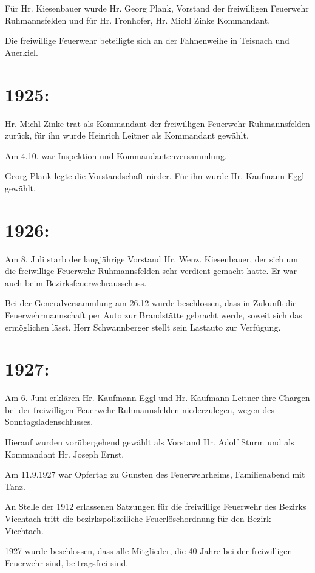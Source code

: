\documentclass[12pt,a4paper]{book}
\begin{document}
Für Hr. Kiesenbauer wurde Hr. Georg Plank, Vorstand der freiwilligen Feuerwehr
Ruhmannsfelden und für Hr. Fronhofer, Hr. Michl Zinke Kommandant.

Die freiwillige Feuerwehr beteiligte sich an der Fahnenweihe in Teisnach und
Auerkiel.

\section{1925:}

Hr. Michl Zinke trat als Kommandant der freiwilligen Feuerwehr Ruhmannsfelden
zurück, für ihn wurde Heinrich Leitner als Kommandant gewählt.

Am 4.10. war Inspektion und Kommandantenversammlung.

Georg Plank legte die Vorstandschaft nieder. Für ihn wurde Hr. Kaufmann Eggl
gewählt.

\section{1926:}

Am 8. Juli starb der langjährige Vorstand Hr. Wenz. Kiesenbauer, der sich um die
freiwillige Feuerwehr Ruhmannsfelden sehr verdient gemacht hatte. Er war auch
beim Bezirksfeuerwehrausschuss.

Bei der Generalversammlung am 26.12 wurde beschlossen, dass in Zukunft die
Feuerwehrmannschaft per Auto zur Brandstätte gebracht werde, soweit sich das
ermöglichen lässt. Herr Schwannberger stellt sein Lastauto zur Verfügung.

\section{1927:}

Am 6. Juni erklären Hr. Kaufmann Eggl und Hr. Kaufmann Leitner ihre Chargen bei
der freiwilligen Feuerwehr Ruhmannsfelden niederzulegen, wegen des
Sonntagsladenschlusses.

Hierauf wurden vorübergehend gewählt als Vorstand Hr. Adolf Sturm und als
Kommandant Hr. Joseph Ernst.

Am 11.9.1927 war Opfertag zu Gunsten des Feuerwehrheims, Familienabend mit Tanz.

An Stelle der 1912 erlassenen Satzungen für die freiwillige Feuerwehr des
Bezirks Viechtach tritt die bezirkspolizeiliche Feuerlöschordnung für den Bezirk
Viechtach.

1927 wurde beschlossen, dass alle Mitglieder, die 40 Jahre bei der freiwilligen
Feuerwehr sind, beitragsfrei sind.
\end{document}
